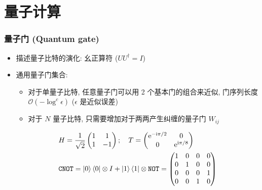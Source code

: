 \documentclass[12pt,hyperref={CJKbookmarks=true},aspectratio=169]{beamer}
\newcommand\mi{\mathrm{i}}
\newcommand\e{\mathrm{e}} %
\begin{document}
\section{量子计算}
\begin{frame}[t]\frametitle{量子门 (Quantum gate)}
\begin{itemize}
	\item 描述量子比特的演化: 幺正算符 ($U U^\dagger = I$)
	\item 通用量子门集合: 
	\begin{itemize}
		\item 对于单量子比特, 任意量子门可以用 2 个基本门的组合来近似, 
		门序列长度 $\mathcal O (-\log^c \epsilon)$ ($\epsilon$ 是近似误差)
		\item 对于 $N$ 量子比特, 只需要增加对于两两产生纠缠的量子门 $W_{ij}$
	\end{itemize}
	\begin{align*}
		&H = \frac{1}{\sqrt 2}\begin{pmatrix}
		1 & 1 \\
		1 & -1
		\end{pmatrix}; \quad 
		T = \begin{pmatrix}
			\e^{-\mi\pi/2} & 0 \\
			0 & \e^{\mi\pi /8}
		\end{pmatrix} \\
		&\mathtt{CNOT} = 
		\ket 0 \bra 0 \otimes I + \ket 1 \bra 1 \otimes \mathtt{NOT} 
		= \begin{pmatrix}
			1 & 0 & 0 & 0\\
			0 & 1 & 0 & 0\\
			0 & 0 & 0 & 1\\
			0 & 0 & 1 & 0
		\end{pmatrix}
	\end{align*}
\end{itemize}
\end{frame}
\end{document}

